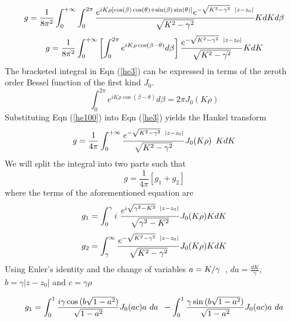 \begin{equation}
g=\frac{1}{8\pi^2}\int_{0}^{+\infty}\int_{0}^{2\pi}\frac{e^{iK\rho{[\cos(\beta)\cos(\theta)+\sin(\beta)\sin(\theta)]}} e^{-\sqrt{K^2-\gamma^2}\enskip|z-z_0|}}{\sqrt{K^2-\gamma^2}}KdK d\beta
\end{equation}
\begin{equation}
\label{he3}
g=\frac{1}{8\pi^2}\int_{0}^{+\infty}
\left [ \int_{0}^{2\pi}e^{i {K}\rho\cos(\beta-\theta)} d \beta \right ]
\frac{e^{-\sqrt{ K^2 -\gamma^2}\enskip|z-z_0|}}{\sqrt{K^2 -\gamma^2}} 
K dK
\end{equation}
The bracketed integral in Eqn (\ref{he3}) can be expressed in terms 
of the zeroth order Bessel function of the first kind $J_0$.
%
\begin{equation}
\label{he100}
\int_{0}^{2\pi}e^{iK\rho\cos(\beta-\theta)}d\beta=2\pi J_0(K\rho)
\end{equation}
%
Substituting  Eqn (\ref{he100}) into Eqn (\ref{he3}) yields
the Hankel transform
%
\begin{equation}
g=\frac{1}{4\pi}\int_{0}^{+\infty}   \frac{e^{-\sqrt{ K^2 -\gamma^2}\enskip|z-z_0|}}{\sqrt{K^2 -\gamma^2}} J_0(K\rho) \enskip K dK
\end{equation}
We will split the  integral into two parts such that
\begin{equation}
\label{final}
g= \frac{1}{4\pi}\left[ g_1 +g_2 \right ]
\end{equation}
where the terms of the aforementioned equation are
\begin{equation}
g_1=\int_{0}^{\gamma}i~\frac{e^{i\sqrt{\gamma^2-K^2}\enskip|z-z_0|}}{\sqrt{\gamma^2-K^2}} J_0(K\rho)   KdK
\end{equation}
\begin{equation}
 g_2=\int_{\gamma}^{\infty}\frac{e^{-\sqrt{K^2 -\gamma^2}\enskip|z-z_0|}}{\sqrt{K^2- \gamma^2} } J_0(K\rho)    KdK
\end{equation}
Using Euler's identity and the 
change of variables $ a = K/\gamma \enskip $, $da=\frac{dK}{\gamma}$,
$b= \gamma|z - z_0 |$  and $c= \gamma \rho$


\begin{equation}
g_1=\int_{0}^{1} \frac{i\gamma \cos{(b\sqrt{1-a^2})}}{\sqrt{1-a^2}} J_0(ac)a~ da \enskip -\int_{0}^{1} \frac{\gamma \sin{(b\sqrt{1-a^2})}}{\sqrt{1-a^2}} J_0(ac)a~ da
\end{equation}

